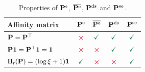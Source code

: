 \begin{table}
\begin{center}
\caption{Properties of $\mathbf{P}^{\mathrm{e}}$, $\overline{\mathbf{P}^{\mathrm{e}}}$, $\mathbf{P}^{\mathrm{ds}}$ and $\mathbf{P}^{\mathrm{se}}$.}
  \begin{tabular}{lcccc}
  \toprule[1.5pt]
  Affinity matrix& $\mathbf{P}^{\mathrm{e}}$& $\overline{\mathbf{P}^{\mathrm{e}}}$
  & $\mathbf{P}^{\mathrm{ds}}$& $\mathbf{P}^{\mathrm{se}}$ \\
  \midrule
  $\mathbf{P}=\mathbf{P}^\top$ & $\red{\boldsymbol\times}$ & $\green{\checkmark}$ & $\green{\checkmark}$ & $\green{\checkmark}$ \\
  $\mathbf{P} \bm{1} = \mathbf{P}^\top \bm{1} = \bm{1}$ & $\red{\boldsymbol\times}$ & $\red{\boldsymbol\times}$ & $\green{\checkmark}$ & $\green{\checkmark}$ \\
  $\operatorname{H}_{\mathrm{r}}(\mathbf{P}) = (\log \xi + 1)\bm{1}$ & $\green{\checkmark}$ & $\red{\boldsymbol\times}$ & $\red{\boldsymbol\times}$ & $\green{\checkmark}$ \\
  \bottomrule[1.5pt]
  \end{tabular}
  \end{center}
\end{table}


